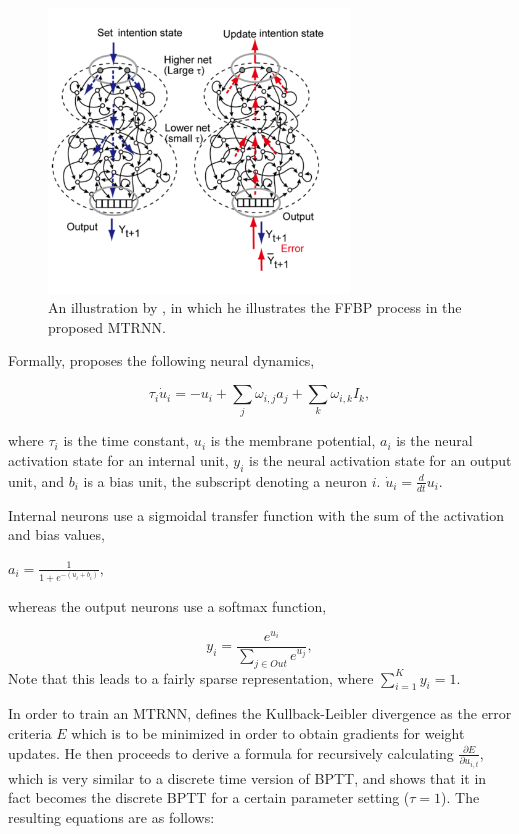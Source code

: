 \begin{figure}
\centering
\includegraphics[width=8cm]{fig/tani_2014_mtrnn}
\caption{An illustration by \cite{Tani2014}, in which he illustrates the FFBP process in the proposed MTRNN.}
\label{fig:tani_2014_mtrnn}
\end{figure}

Formally, \cite{Tani2014} proposes the following neural dynamics,

\begin{equation}\label{tani_membrane_potential}
    \tau_i\dot{u}_i = -u_i + \sum_{j}{}\omega_{i,j}a_j + \sum_{k}{}\omega_{i,k} I_k,
\end{equation}

where $\tau_i$ is the time constant, $u_i$ is the membrane potential, $a_i$ is the neural activation state for an internal unit, $y_i$ is the neural activation state for an output unit, and $b_i$ is a bias unit, the subscript denoting a neuron $i$. $\dot{u}_i = \frac{d}{d t}u_i$.

Internal neurons use a sigmoidal transfer function with the sum of the activation and bias values, 

\begin{center}\begin{math}
    a_i = \frac{1}{1+e^{-(u_i+b_i)}},
\end{math}\end{center}
whereas the output neurons use a softmax function,

\begin{equation}\label{tani_softmax}
    y_i = \frac{e^{u_i}}{\sum_{j \in Out}^{}{e^{u_j}}},
\end{equation}
Note that this leads to a fairly sparse representation, where $\sum_{i=1}^{K} y_i = 1$.

In order to train an MTRNN, \cite{Tani2014} defines the Kullback-Leibler divergence as the error criteria $E$ which is to be minimized in order to obtain gradients for weight updates. He then proceeds to derive a formula for recursively calculating $\frac{\partial E}{\partial u_{i,t}}$, which is very similar to a discrete time version of BPTT, and shows that it in fact becomes the discrete BPTT for a certain parameter setting ($\tau=1$). The resulting equations are as follows:

